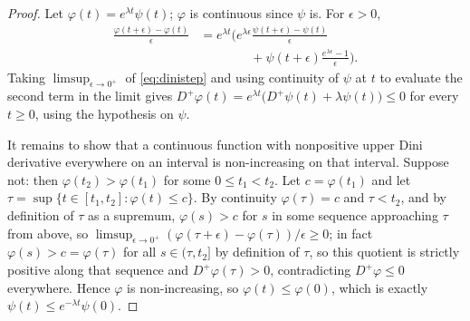 \documentclass[10pt,a4paper]{amsart}
\begin{document}
\begin{proof}
Let $\varphi(t)=e^{\lambda t}\psi(t)$; $\varphi$ is continuous since $\psi$ is. For $\epsilon>0$,
\begin{equation}
\label{eq:dinistep}
\begin{aligned}
\frac{\varphi(t+\epsilon)-\varphi(t)}{\epsilon}
&=
e^{\lambda t}\Bigg(
e^{\lambda\epsilon}
\frac{\psi(t+\epsilon)-\psi(t)}{\epsilon}
\\
&\qquad\qquad
+\psi(t+\epsilon)
\frac{e^{\lambda\epsilon}-1}{\epsilon}
\Bigg).
\end{aligned}
\end{equation}
Taking $\limsup_{\epsilon\to0^+}$ of \eqref{eq:dinistep} and using continuity of $\psi$ at $t$ to evaluate the second term in the limit gives $D^+\varphi(t)=e^{\lambda t}\big(D^+\psi(t)+\lambda\psi(t)\big)\le0$ for every $t\ge0$, using the hypothesis on $\psi$.

It remains to show that a continuous function with nonpositive upper Dini derivative everywhere on an interval is non-increasing on that interval. Suppose not: then $\varphi(t_2)>\varphi(t_1)$ for some $0\le t_1<t_2$. Let $c=\varphi(t_1)$ and let $\tau=\sup\{t\in[t_1,t_2]:\varphi(t)\le c\}$. By continuity $\varphi(\tau)=c$ and $\tau<t_2$, and by definition of $\tau$ as a supremum, $\varphi(s)>c$ for $s$ in some sequence approaching $\tau$ from above, so $\limsup_{\epsilon\to0^+}(\varphi(\tau+\epsilon)-\varphi(\tau))/\epsilon\ge0$; in fact $\varphi(s)>c=\varphi(\tau)$ for all $s\in(\tau,t_2]$ by definition of $\tau$, so this quotient is strictly positive along that sequence and $D^+\varphi(\tau)>0$, contradicting $D^+\varphi\le0$ everywhere. Hence $\varphi$ is non-increasing, so $\varphi(t)\le\varphi(0)$, which is exactly $\psi(t)\le e^{-\lambda t}\psi(0)$.
\end{proof}
\end{document}
